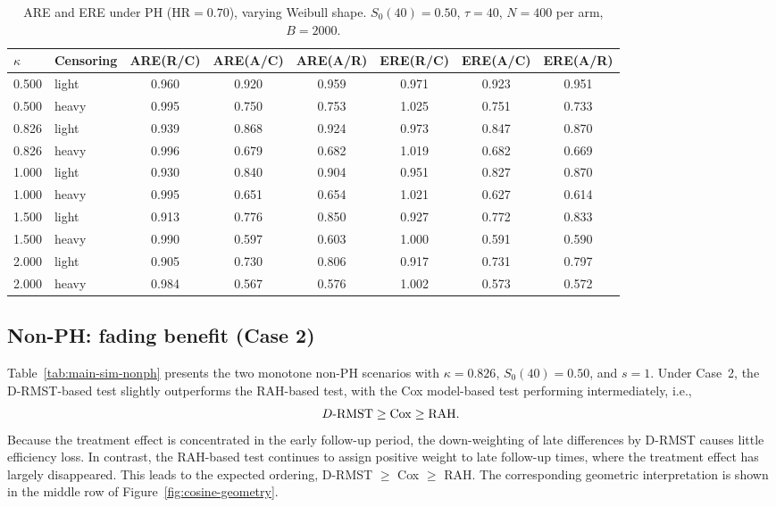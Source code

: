 \documentclass[12pt]{article}
\newcommand{\RAH}{\mathrm{RAH}}
\newcommand{\DRMST}{D\text{-}\mathrm{RMST}}
\begin{document}
\begin{table}[ht]
\centering
\small
\caption{ARE and ERE under PH (HR$=0.70$), varying Weibull shape.
  $S_0(40)=0.50$, $\tau=40$, $N=400$ per arm, $B=2000$.}
\label{tab:main-sim-ph-hr070-kappa-050-200-light-heavy}
\setlength{\tabcolsep}{4pt}
\begin{tabular}{llcccccc}
\hline
$\kappa$ & Censoring & ARE(R/C) & ARE(A/C) & ARE(A/R) & ERE(R/C) & ERE(A/C) & ERE(A/R) \\
\hline
0.500 & light & 0.960 & 0.920 & 0.959 & 0.971 & 0.923 & 0.951 \\
0.500 & heavy & 0.995 & 0.750 & 0.753 & 1.025 & 0.751 & 0.733 \\
0.826 & light & 0.939 & 0.868 & 0.924 & 0.973 & 0.847 & 0.870 \\
0.826 & heavy & 0.996 & 0.679 & 0.682 & 1.019 & 0.682 & 0.669 \\
1.000 & light & 0.930 & 0.840 & 0.904 & 0.951 & 0.827 & 0.870 \\
1.000 & heavy & 0.995 & 0.651 & 0.654 & 1.021 & 0.627 & 0.614 \\
1.500 & light & 0.913 & 0.776 & 0.850 & 0.927 & 0.772 & 0.833 \\
1.500 & heavy & 0.990 & 0.597 & 0.603 & 1.000 & 0.591 & 0.590 \\
2.000 & light & 0.905 & 0.730 & 0.806 & 0.917 & 0.731 & 0.797 \\
2.000 & heavy & 0.984 & 0.567 & 0.576 & 1.002 & 0.573 & 0.572 \\
\hline
\end{tabular}
\end{table}


\subsection{Non-PH: fading benefit (Case 2)}
\label{sec:sim-fading}

Table~\ref{tab:main-sim-nonph} presents the two monotone non-PH scenarios with $\kappa=0.826$, $S_0(40)=0.50$, and $s=1$. Under Case~2, the D-RMST-based test slightly outperforms the RAH-based test, with the Cox model-based test performing intermediately, i.e.,
$$ \DRMST\ge \rm{Cox}\ge \RAH.$$
Because the treatment effect is concentrated in the early follow-up period, the down-weighting of late differences by D-RMST causes little efficiency loss. In contrast, the RAH-based test continues to assign positive weight to late follow-up times, where the treatment effect has largely disappeared. This leads to the expected ordering, D-RMST $\geq$ Cox $\geq$ RAH. The corresponding geometric interpretation is shown in the middle row of Figure~\ref{fig:cosine-geometry}.
\end{document}
